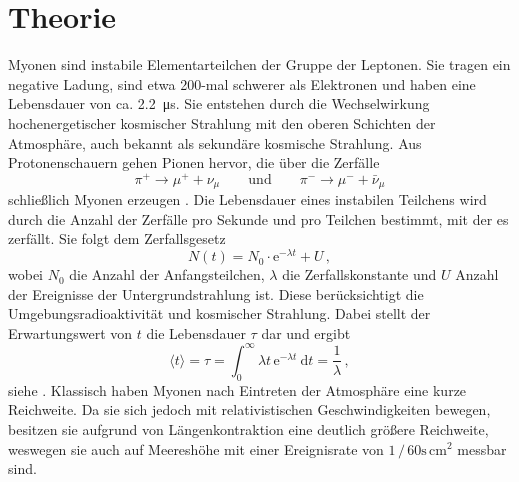 \section{Theorie}
\label{sec:Theorie}

Myonen sind instabile Elementarteilchen der Gruppe der Leptonen. 
Sie tragen ein negative Ladung, sind etwa 200-mal schwerer als Elektronen 
und haben eine Lebensdauer von ca. \qty{2,2}{\micro\second}.
Sie entstehen durch die Wechselwirkung hochenergetischer kosmischer Strahlung
mit den oberen Schichten der Atmosphäre,
auch bekannt als sekundäre kosmische Strahlung.
Aus Protonenschauern gehen Pionen hervor,
die über die Zerfälle
\begin{equation*}
    \pi^{+} \rightarrow \mu^{+}+\nu_\mu \qquad \text {und} \qquad \pi^{-} \rightarrow \mu^{-}+\bar{\nu}_\mu
\end{equation*}
schließlich Myonen erzeugen \cite{demtroeder4}.
Die Lebensdauer eines instabilen Teilchens wird durch die Anzahl der Zerfälle pro Sekunde 
und pro Teilchen bestimmt, mit der es zerfällt. 
Sie folgt dem Zerfallsgesetz
\begin{equation} \label{eq:zerfallsgesetz}
    N(t) = N_0 \cdot \mathrm{e}^{-\lambda t} + U \, ,
\end{equation}
wobei $N_0$ die Anzahl der Anfangsteilchen, $\lambda$ die Zerfallskonstante
und $U$ Anzahl der Ereignisse der Untergrundstrahlung ist.
Diese berücksichtigt die Umgebungsradioaktivität und kosmischer Strahlung.
Dabei stellt der Erwartungswert von $t$ die Lebensdauer $\tau$ dar und ergibt
\begin{equation} \label{eq:tau}
    \langle t\rangle=\tau=\int_0^{\infty} \lambda t \, \mathrm{e}^{-\lambda t} \mathrm{~d} t=\frac{1}{\lambda} \, ,
\end{equation}
siehe \cite{demtroeder4}.
Klassisch haben Myonen nach Eintreten der Atmosphäre eine kurze Reichweite.
Da sie sich jedoch mit relativistischen Geschwindigkeiten bewegen,
besitzen sie aufgrund von Längenkontraktion eine deutlich größere Reichweite,
weswegen sie auch auf Meereshöhe mit einer Ereignisrate von $1 \, / \, 60\text{s} \, \text{cm}^2$ \cite[208]{grupen} messbar sind.


